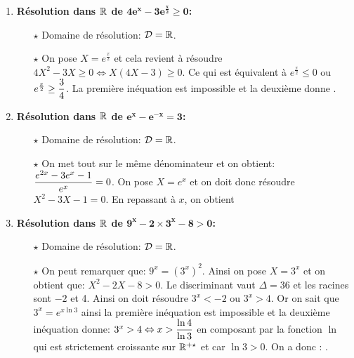 \documentclass[a4paper, 11pt]{article}
\begin{document}
\begin{correction}
\begin{enumerate}
\begin{itemize}
\end{itemize} 
\item \textbf{R\'esolution dans $\mathbf{\mathbb{R}}$ de $\mathbf{4e^x-3e^{\frac{x}{2}}\geq 0}$:}\\
\noindent \begin{itemize}
\item[$\star$] Domaine de r\'esolution: $\mathcal{D}=\mathbb{R}$.
\item[$\star$] On pose $X=e^{\frac{x}{2}}$ et cela revient \`{a} r\'esoudre $4X^2-3X\geq 0\Leftrightarrow X(4X-3)\geq 0$. Ce qui est \'equivalent \`{a} $e^{\frac{x}{2}} \leq 0$ ou $e^{\frac{x}{2}}\geq \displaystyle\frac{3}{4}$. La premi\`{e}re in\'equation est impossible et la deuxi\`{e}me donne .
\end{itemize} 
\item \textbf{R\'esolution dans $\mathbf{\mathbb{R}}$ de $\mathbf{e^x-e^{-x}=3}$:}\\
\noindent \begin{itemize}
\item[$\star$] Domaine de r\'esolution: $\mathcal{D}=\mathbb{R}$.
\item[$\star$] On met tout sur le m\^{e}me d\'enominateur et on obtient: $\displaystyle\frac{ e^{2x}-3e^x-1 }{e^x}=0$. On pose $X=e^x$ et on doit donc r\'esoudre $X^2-3X-1=0$. En repassant \`{a} $x$, on obtient 
\end{itemize} 
\item \textbf{R\'esolution dans $\mathbf{\mathbb{R}}$ de $\mathbf{9^x-2\times 3^x-8>0}$:}\\
\noindent 
\begin{itemize}
\item[$\star$] Domaine de r\'esolution: $\mathcal{D}=\mathbb{R}$.
\item[$\star$] On peut remarquer que: $9^x=(3^x)^2$. Ainsi on pose $X=3^x$ et on obtient que: $X^2-2X-8>0$. Le discriminant vaut $\Delta=36$ et les racines sont $-2$ et 4. Ainsi on doit r\'esoudre $3^x<-2$ ou $3^x>4$. Or on sait que $3^x=e^{x\ln{3}}$ ainsi la premi\`{e}re in\'equation est impossible et la deuxi\`{e}me in\'equation donne: 
$3^x>4 \Leftrightarrow x>\displaystyle\frac{\ln{4}}{\ln{3}}$ en composant par la fonction $\ln{}$ qui est strictement croissante sur $\mathbb{R}^{+\star}$ et car $\ln{3}>0$.  On a donc : .
\end{itemize} 

\end{enumerate}
\end{correction}
\end{document}
